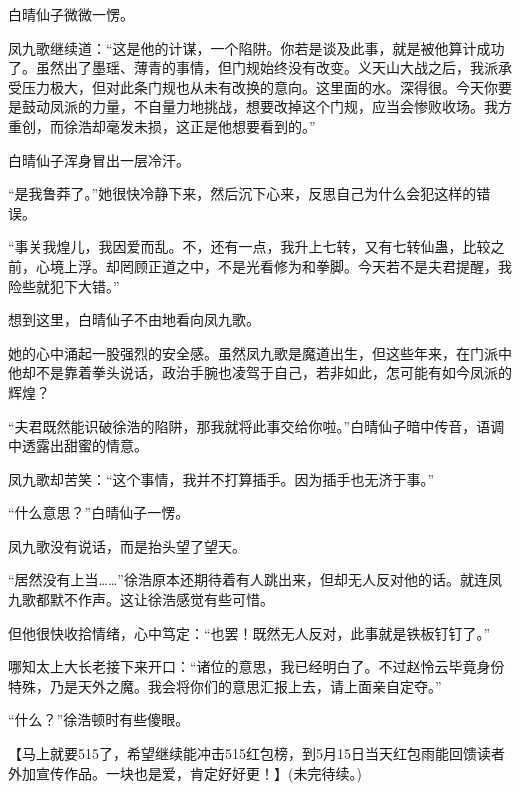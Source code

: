 \begin{this_body}
白晴仙子微微一愣。

凤九歌继续道：“这是他的计谋，一个陷阱。你若是谈及此事，就是被他算计成功了。虽然出了墨瑶、薄青的事情，但门规始终没有改变。义天山大战之后，我派承受压力极大，但对此条门规也从未有改换的意向。这里面的水。深得很。今天你要是鼓动凤派的力量，不自量力地挑战，想要改掉这个门规，应当会惨败收场。我方重创，而徐浩却毫发未损，这正是他想要看到的。”

白晴仙子浑身冒出一层冷汗。

“是我鲁莽了。”她很快冷静下来，然后沉下心来，反思自己为什么会犯这样的错误。

“事关我煌儿，我因爱而乱。不，还有一点，我升上七转，又有七转仙蛊，比较之前，心境上浮。却罔顾正道之中，不是光看修为和拳脚。今天若不是夫君提醒，我险些就犯下大错。”

想到这里，白晴仙子不由地看向凤九歌。

她的心中涌起一股强烈的安全感。虽然凤九歌是魔道出生，但这些年来，在门派中他却不是靠着拳头说话，政治手腕也凌驾于自己，若非如此，怎可能有如今凤派的辉煌？

“夫君既然能识破徐浩的陷阱，那我就将此事交给你啦。”白晴仙子暗中传音，语调中透露出甜蜜的情意。

凤九歌却苦笑：“这个事情，我并不打算插手。因为插手也无济于事。”

“什么意思？”白晴仙子一愣。

凤九歌没有说话，而是抬头望了望天。

“居然没有上当……”徐浩原本还期待着有人跳出来，但却无人反对他的话。就连凤九歌都默不作声。这让徐浩感觉有些可惜。

但他很快收拾情绪，心中笃定：“也罢！既然无人反对，此事就是铁板钉钉了。”

哪知太上大长老接下来开口：“诸位的意思，我已经明白了。不过赵怜云毕竟身份特殊，乃是天外之魔。我会将你们的意思汇报上去，请上面亲自定夺。”

“什么？”徐浩顿时有些傻眼。

【马上就要515了，希望继续能冲击515红包榜，到5月15日当天红包雨能回馈读者外加宣传作品。一块也是爱，肯定好好更！】(未完待续。)

\end{this_body}

